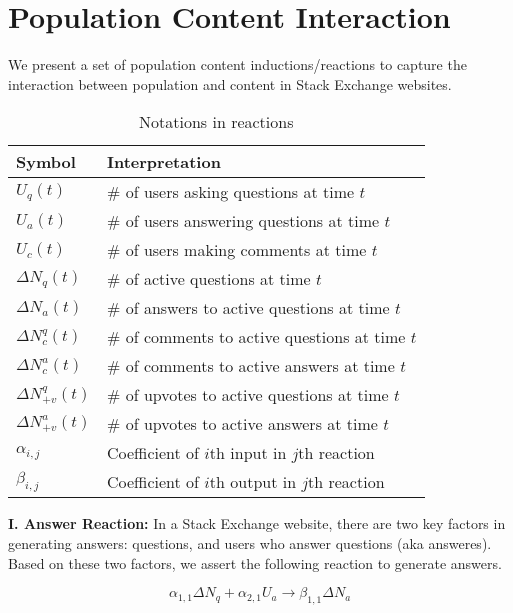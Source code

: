 \documentclass{sig-alternate-10pt}
\begin{document}
\section{Population Content Interaction}
We present a set of population content inductions/reactions to capture the interaction between population and content in Stack Exchange websites. %


\begin{table}[hbt]
	\centering
	\begin{tabular}{|l|l|}
	\hline
	\textbf{Symbol} & \textbf{Interpretation}\\ \hline
	$U_q(t)$ & \# of users asking questions at time $t$\\ \hline
	$U_a(t)$ & \# of users answering questions at time $t$\\ \hline
	$U_c(t)$ & \# of users making comments at time $t$\\ \hline
	$\Delta N_q(t)$ & \# of active questions at time $t$\\ \hline
	$\Delta N_a(t)$ & \# of answers to active questions at time $t$\\ \hline
	$\Delta N_c^q(t)$ & \# of comments to active questions at time $t$\\ \hline
	$\Delta N_c^a(t)$ & \# of comments to active answers at time $t$\\ \hline
	$\Delta N_{+v}^q(t)$ & \# of upvotes to active questions at time $t$\\ \hline
	$\Delta N_{+v}^a(t)$ & \# of upvotes to active answers at time $t$\\ \hline
	$\alpha_{i, j}$ & Coefficient of $i$th input in $j$th reaction\\ \hline
	$\beta_{i, j}$ & Coefficient of $i$th output in $j$th reaction\\ \hline
	 \end{tabular}
    \caption{Notations in reactions}
\end{table}

\noindent \textbf{I. Answer Reaction:} In a Stack Exchange website, there are two key factors in generating answers: questions, and users who answer questions (aka answeres). Based on these two factors, we assert the following reaction to generate answers.
  
  \begin{equation*}
      \alpha_{1, 1} \Delta N_q + \alpha_{2, 1} U_a \rightarrow \beta_{1, 1} \Delta N_a
  \end{equation*}
  
\end{document}
